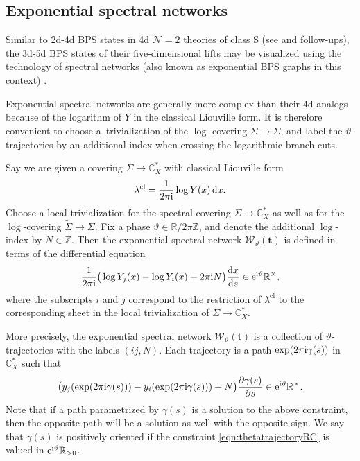 \documentclass[pdftex]{sigma}
\numberwithin{equation}{section}
\begin{document}
\subsection{Exponential spectral networks}\label{sec:spectralnetwork}

Similar to 2d-4d BPS states in 4d $\mathcal{N}=2$ theories of class S (see \cite{Gaiotto:2009hg} and follow-ups), the 3d-5d BPS states of their five-dimensional lifts may be visualized using the technology of spectral networks (also known as exponential BPS graphs in this context) \cite{Banerjee:2018syt, Eager:2016yxd}.

Exponential spectral networks are generally more complex than their 4d analogs because of the logarithm of $Y$ in the classical Liouville form. It is therefore convenient to choose a~trivialization of the $\log$-covering $\widetilde{\Sigma} \to \Sigma$, and label the $\vartheta$-trajectories by an additional index when crossing the logarithmic branch-cuts.

Say we are given a covering $\Sigma \to \mathbb{C}^*_X$ with classical Liouville form
\begin{equation*}
\lambda^\mathrm{cl} = \frac{1}{2 \pi \mathrm{i}} \log Y(x) \,{\rm d}x.
\end{equation*}
Choose a local trivialization for the spectral covering $\Sigma \to \mathbb{C}^*_X$ as well as for the $\log$-covering $\widetilde{\Sigma} \to \Sigma$. Fix a phase $\vartheta \in \mathbb{R}/2 \pi \mathbb{Z}$, and denote the additional $\log$-index by $N \in \mathbb{Z}$. Then the exponential spectral network $\mathcal{W}_\vartheta(\mathbf{t})$ is defined in terms of the differential equation
\begin{align}\label{eq:network_trajectory}
 \frac{1}{2 \pi \mathrm{i}} \big( \log Y_j(x) - \log Y_i(x) + 2 \pi \mathrm{i} N \big) \frac{{\rm d} x}{{\rm d} s} \in {\rm e}^{\mathrm{i} \vartheta} \mathbb{R}^\times,
\end{align}
where the subscripts $i$ and $j$ correspond to the restriction of $\lambda^\mathrm{cl}$ to the corresponding sheet in the local trivialization of $\Sigma \to \mathbb{C}^*_X$.

More precisely, the exponential spectral network $\mathcal{W}_\vartheta(\mathbf{t})$ is a collection of $\vartheta$-trajectories with the labels $(ij,N)$. Each trajectory is a path $\exp (2 \pi {\rm i} \gamma(s))$ in $\mathbb{C}^*_X$ such that
\begin{align}\label{eqn:thetatrajectoryRC}
 \big( y_j ( \exp(2 \pi \mathrm{i} \gamma(s)) ) - y_i ( \exp(2 \pi \mathrm{i} \gamma(s)) ) + N \big) \frac{ \partial \gamma(s)}{\partial s} \in {\rm e}^{\mathrm{i} \vartheta} \mathbb{R}^\times.
\end{align}
Note that if a path parametrized by $\gamma(s)$ is a solution to the above constraint, then the opposite path will be a solution as well with the opposite sign. We say that $\gamma(s)$ is positively oriented if the constraint \eqref{eqn:thetatrajectoryRC} is valued in ${\rm e}^{\mathrm{i} \vartheta} \mathbb{R}_{>0}$.
\end{document}
